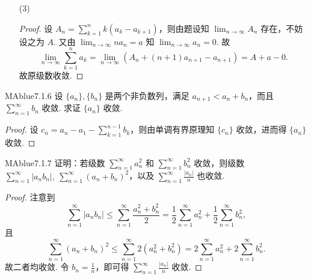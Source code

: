 \begin{enumerate}
    \item[(3)]
    \begin{proof}
        设 $A_n = \sum_{k=1}^n k (a_k - a_{k+1})$，则由题设知 $\lim_{n \to \infty} A_n$ 存在，不妨设之为 $A$. 又由 $\lim_{n \to \infty} n a_n = a$ 知 $\lim_{n \to \infty} a_n = 0$. 故
        \[
            \lim_{n \to \infty} \sum_{k=1}^n a_k = \lim_{n \to \infty} \left( A_n + (n+1)a_{n+1} - a_{n+1} \right) = A + a - 0.
        \]
        故原级数收敛.
    \end{proof}
\end{enumerate}

\begin{problem}{MAblue}{7.1.6}
    设 $\{ a_n \}, \{ b_n \}$ 是两个非负数列，满足 $a_{n+1} < a_n + b_n$，而且 $\sum_{n=1}^\infty b_n$ 收敛. 求证 $\{ a_n \}$ 收敛.
\end{problem}

\begin{proof}
    设 $c_n = a_n - a_1 - \sum_{k=1}^{n-1} b_k$，则由单调有界原理知 $\{ c_n \}$ 收敛，进而得 $\{ a_n \}$ 收敛.
\end{proof}

\begin{problem}{MAblue}{7.1.7}
    证明：若级数 $\sum_{n=1}^\infty a_n^2$ 和 $\sum_{n=1}^\infty b_n^2$ 收敛，则级数 $\sum_{n=1}^\infty |a_nb_n|,\ \sum_{n=1}^\infty (a_n+b_n)^2$，以及 $\sum_{n=1}^\infty \frac {|a_n|} n$ 也收敛.
\end{problem}

\begin{proof}
    注意到
    \[
        \sum_{n=1}^\infty |a_nb_n| \leqslant \sum_{n=1}^\infty \frac {a_n^2+b_n^2} 2 = \frac 1 2 \sum_{n=1}^\infty a_n^2 + \frac 1 2 \sum_{n=1}^\infty b_n^2,
    \]
    且
    \[
        \sum_{n=1}^\infty (a_n+b_n)^2 \leqslant \sum_{n=1}^\infty 2(a_n^2+b_n^2) = 2\sum_{n=1}^\infty a_n^2 + 2\sum_{n=1}^\infty b_n^2.
    \]
    故二者均收敛. 令 $b_n = \frac 1 n$，即可得 $\sum_{n=1}^\infty \frac {|a_n|} n$ 收敛.
\end{proof}

